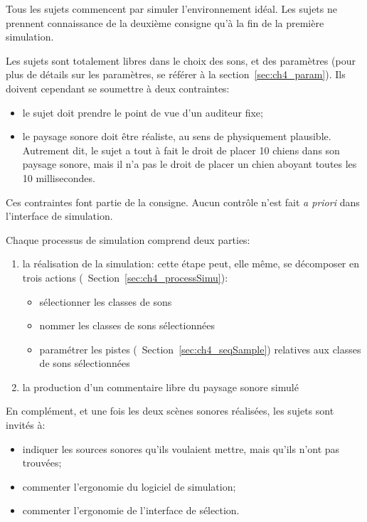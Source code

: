 Tous les sujets commencent par simuler l'environnement idéal. Les sujets ne prennent connaissance de la deuxième consigne qu'à la fin de la première simulation.

Les sujets sont totalement libres dans le choix des sons, et des paramètres (pour plus de détails sur les paramètres, se référer à la section~\ref{sec:ch4_param}). Ils doivent cependant se soumettre à deux contraintes:

\begin{itemize}
\item le sujet doit prendre le point de vue d’un auditeur fixe;

\item le paysage sonore doit être réaliste, au sens de physiquement plausible. Autrement dit, le sujet a tout à fait le droit de placer 10 chiens dans son paysage sonore, mais il n’a pas le droit de placer un chien aboyant toutes les 10 millisecondes.

\end{itemize}

Ces contraintes font partie de la consigne. Aucun contrôle n'est fait \emph{a priori} dans l'interface de simulation.

Chaque processus de simulation comprend deux parties:

\begin{enumerate}
\item la réalisation de la simulation: cette étape peut, elle même, se décomposer en trois actions (\cf~Section~\ref{sec:ch4_processSimu}):
\begin{itemize}
\item sélectionner les classes de sons
\item nommer les classes de sons sélectionnées
\item paramétrer les pistes (\cf~Section~\ref{sec:ch4_seqSample}) relatives aux classes de sons sélectionnées
\end{itemize}
\item la production d'un commentaire libre du paysage sonore simulé
\end{enumerate}

En complément, et une fois les deux scènes sonores réalisées, les sujets sont invités à:

\begin{itemize}
\item indiquer les sources sonores qu'ils voulaient mettre, mais qu'ils n'ont pas trouvées;
\item commenter l’ergonomie du logiciel de simulation;
\item commenter l’ergonomie de l'interface de sélection.
\end{itemize}

